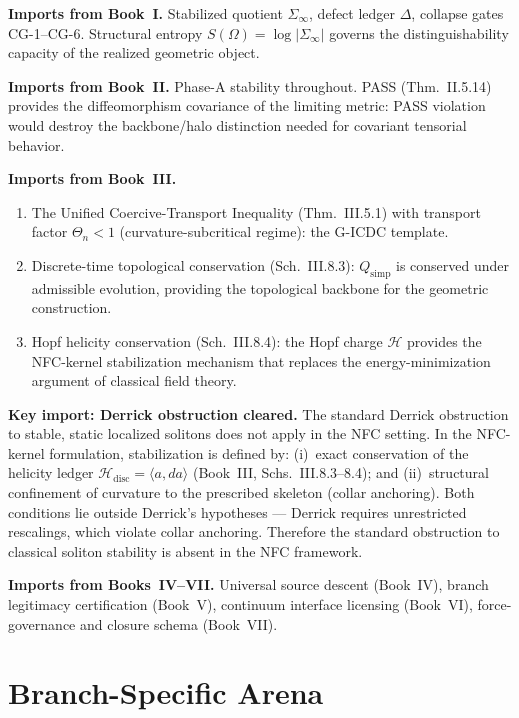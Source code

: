 \documentclass[12pt,oneside]{amsbook}
\theoremstyle{plain}
\theoremstyle{definition}
\theoremstyle{remark}
\begin{document}
\textbf{Imports from Book~I.} Stabilized quotient $\Sigma_\infty$,
defect ledger $\Delta$, collapse gates CG-1--CG-6. Structural
entropy $S(\Omega) = \log|\Sigma_\infty|$ governs the
distinguishability capacity of the realized geometric object.

\textbf{Imports from Book~II.} Phase-A stability throughout.
PASS (Thm.~II.5.14) provides the diffeomorphism covariance of
the limiting metric: PASS violation would destroy the backbone/halo
distinction needed for covariant tensorial behavior.

\textbf{Imports from Book~III.}
\begin{enumerate}[label=\textup{(\arabic*)}]
 \item The Unified Coercive-Transport Inequality (Thm.~III.5.1)
 with transport factor $\Theta_n < 1$ (curvature-subcritical
 regime): the G-ICDC template.
 \item Discrete-time topological conservation
 (Sch.~III.8.3): $Q_{\mathrm{simp}}$ is conserved under
 admissible evolution, providing the topological backbone
 for the geometric construction.
 \item Hopf helicity conservation (Sch.~III.8.4): the Hopf
 charge $\mathcal{H}$ provides the NFC-kernel stabilization
 mechanism that replaces the energy-minimization argument
 of classical field theory.
\end{enumerate}

\textbf{Key import: Derrick obstruction cleared.}
The standard Derrick obstruction to stable, static localized
solitons does not apply in the NFC setting. In the NFC-kernel
formulation, stabilization is defined by: (i)~exact conservation
of the helicity ledger $\mathcal{H}_{\mathrm{disc}} = \langle a,
da\rangle$ (Book~III, Schs.~III.8.3--8.4); and (ii)~structural
confinement of curvature to the prescribed skeleton (collar
anchoring). Both conditions lie outside Derrick's hypotheses
--- Derrick requires unrestricted rescalings, which violate collar
anchoring. Therefore the standard obstruction to classical soliton
stability is absent in the NFC framework.

\textbf{Imports from Books~IV--VII.} Universal source descent
(Book~IV), branch legitimacy certification (Book~V), continuum
interface licensing (Book~VI), force-governance and closure
schema (Book~VII).

\section{Branch-Specific Arena}
\label{sec:arena}
\end{document}
